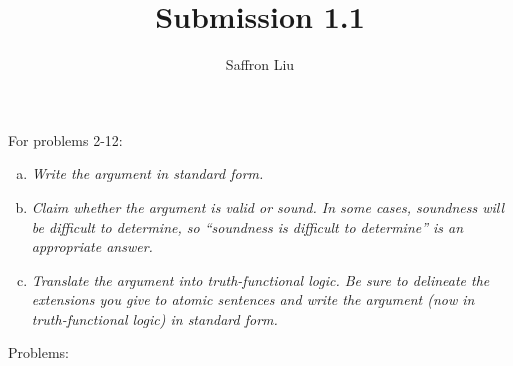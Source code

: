 \documentclass{article}
\title{Submission 1.1}
\author{Saffron Liu}
\date{}
\begin{document}
\maketitle
\begin{flushleft}
    For problems 2-12:\\
\end{flushleft}
\begin{enumerate}[(a)]
    \item \textit{Write the argument in standard form.}
    \item \textit{Claim whether the argument is valid or sound. In some cases, soundness will be difficult to determine, so “soundness is difficult to determine” is an appropriate answer.}
    \item \textit{Translate the argument into truth-functional logic. Be sure to delineate the extensions you give to atomic sentences and write the argument (now in truth-functional logic) in standard form.}
\end{enumerate}
\begin{flushleft}
    Problems:
\end{flushleft}
\end{document}
